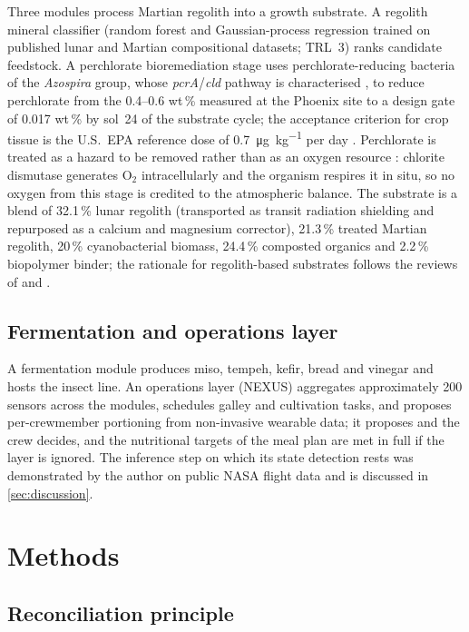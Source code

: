 \documentclass[11pt,a4paper,3p,authoryear]{elsarticle}
\begin{document}
Three modules process Martian regolith into a growth substrate. A regolith mineral classifier (random forest and Gaussian-process regression trained on published lunar and Martian compositional datasets; TRL~3) ranks candidate feedstock. A perchlorate bioremediation stage uses perchlorate-reducing bacteria of the \emph{Azospira} group, whose \emph{pcrA}/\emph{cld} pathway is characterised \citep{Melnyk2011perchlorate}, to reduce perchlorate from the 0.4--0.6 wt\,\% measured at the Phoenix site \citep{Hecht2009perchlorate} to a design gate of 0.017 wt\,\% by sol~24 of the substrate cycle; the acceptance criterion for crop tissue is the U.S.\ EPA reference dose of \SI{0.7}{\micro\gram\per\kilo\gram} per day \citep{EPA2005perchlorate}. Perchlorate is treated as a hazard to be removed rather than as an oxygen resource \citep{Davila2013perchlorate}: chlorite dismutase generates O$_2$ intracellularly and the organism respires it in situ, so no oxygen from this stage is credited to the atmospheric balance. The substrate is a blend of 32.1\,\% lunar regolith (transported as transit radiation shielding and repurposed as a calcium and magnesium corrector), 21.3\,\% treated Martian regolith, 20\,\% cyanobacterial biomass, 24.4\,\% composted organics and 2.2\,\% biopolymer binder; the rationale for regolith-based substrates follows the reviews of \citet{Duri2022regolith} and \citet{Fackrell2024regolith}.

\subsection{Fermentation and operations layer}

A fermentation module produces miso, tempeh, kefir, bread and vinegar and hosts the insect line. An operations layer (NEXUS) aggregates approximately 200 sensors across the modules, schedules galley and cultivation tasks, and proposes per-crewmember portioning from non-invasive wearable data; it proposes and the crew decides, and the nutritional targets of the meal plan are met in full if the layer is ignored. The inference step on which its state detection rests was demonstrated by the author on public NASA flight data \citep{PuertaAngulo2026hrp} and is discussed in \cref{sec:discussion}.

\section{Methods}\label{sec:methods}

\subsection{Reconciliation principle}
\end{document}
